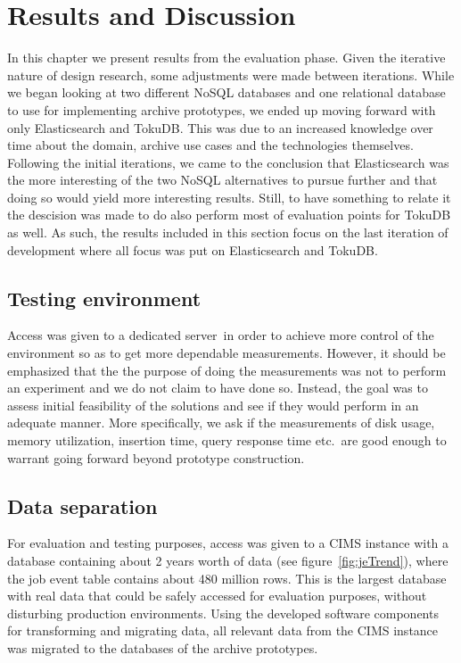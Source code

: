\chapter{Results and Discussion}
\label{chap:results}

In this chapter we present results from the evaluation phase. Given the iterative nature of design research, some adjustments were made between iterations. While we began looking at two different NoSQL databases and one relational database to use for implementing archive prototypes, we ended up moving forward with only Elasticsearch and TokuDB. This was due to an increased knowledge over time about the domain, archive use cases and the technologies themselves. Following the initial iterations, we came to the conclusion that Elasticsearch was the more interesting of the two NoSQL alternatives to pursue further and that doing so would yield more interesting results. Still, to have something to relate it the descision was made to do also perform most of evaluation points for TokuDB as well.
As such, the results included in this section focus on the last iteration of development where all focus was put on Elasticsearch and TokuDB. 

\section{Testing environment}
Access was given to a dedicated server\footnotemark\ in order to achieve more control of the environment so as to get more dependable measurements. However, it should be emphasized that the the purpose of doing the measurements was not to perform an experiment and we do not claim to have done so. Instead, the goal was to assess initial feasibility of the solutions and see if they would perform in an adequate manner. More specifically, we ask if the measurements of disk usage, memory utilization, insertion time, query response time etc.\ are good enough to warrant going forward beyond prototype construction.


\section{Data separation}
For evaluation and testing purposes, access was given to a CIMS instance with a database containing about 2 years worth of data (see figure~\ref{fig:jeTrend}), where the job event table contains about 480 million rows. This is the largest database with real data that could be safely accessed for evaluation purposes, without disturbing production environments. Using the developed software components for transforming and migrating data, all relevant data from the CIMS instance was migrated to the databases of the archive prototypes.


